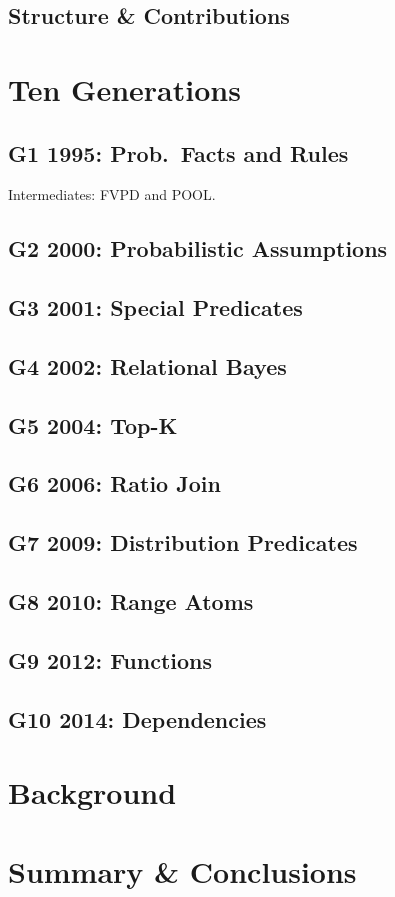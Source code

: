 \subsection{Structure \& Contributions}

\section{Ten Generations}

\subsection{G1 1995: Prob.~Facts and Rules}


Intermediates: FVPD and POOL.

\subsection{G2 2000: Probabilistic Assumptions}


\subsection{G3 2001: Special Predicates}


\subsection{G4 2002: Relational Bayes}


\subsection{G5 2004: Top-K}


\subsection{G6 2006: Ratio Join}


\subsection{G7 2009: Distribution Predicates}


\subsection{G8 2010: Range Atoms}


\subsection{G9 2012: Functions}


\subsection{G10 2014: Dependencies}


\section{Background}

\section{Summary \& Conclusions}
